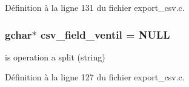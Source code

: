 Définition à la ligne 131 du fichier export\_\-csv.c.

\subsubsection[{csv\_\-field\_\-ventil}]{\setlength{\rightskip}{0pt plus 5cm}gchar$\ast$ {\bf csv\_\-field\_\-ventil} = NULL}\label{export__csv_8c_a59e8ecade5b40fdede892f840113c625}
is operation a split (string) 

Définition à la ligne 127 du fichier export\_\-csv.c.

